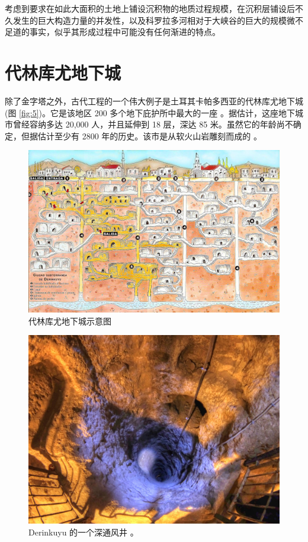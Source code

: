 \documentclass[10pt,twocolumn,letterpaper]{article}
\begin{document}
考虑到要求在如此大面积的土地上铺设沉积物的地质过程规模，在沉积层铺设后不久发生的巨大构造力量的并发性，以及科罗拉多河相对于大峡谷的巨大的规模微不足道的事实，似乎其形成过程中可能没有任何渐进的特点。

\section{代林库尤地下城}

除了金字塔之外，古代工程的一个伟大例子是土耳其卡帕多西亚的代林库尤地下城 (图 \ref{fig:5})。它是该地区 200 多个地下庇护所中最大的一座 \cite{54}。据估计，这座地下城市曾经容纳多达 20,000 人，并且延伸到 18 层，深达 85 米。虽然它的年龄尚不确定，但据估计至少有 2800 年的历史。该市是从软火山岩雕刻而成的 \cite{52, 53}。

\begin{figure}[t]
\begin{center}
   \includegraphics[width=1\linewidth]{derinkuyu.jpeg}
\end{center}
   \caption{代林库尤地下城示意图 \cite{56}}
\label{fig:5}
\label{fig:onecol}
\end{figure}

\begin{figure}[t]
\begin{center}
   \includegraphics[width=1\linewidth]{derinkuyu-air.jpg}
\end{center}
   \caption{Derinkuyu 的一个深通风井 \cite{53}。}
\label{fig:6}
\label{fig:onecol}
\end{figure}
\end{document}
